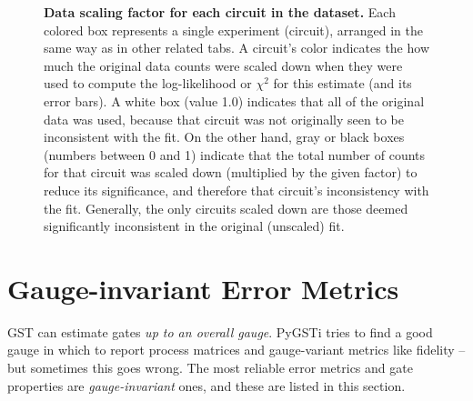 \documentclass{article}[11pt]
\newcommand{\putfield}[2]{#2}
\begin{document}
{{{}{}

\begin{figure}
  \begin{center}
    \putfield{dataScalingColorBoxPlot}{}
    \caption{\textbf{Data scaling factor for each circuit in the dataset.}  Each colored box represents a single experiment (circuit), arranged in the same way as in other related tabs.  A circuit's color indicates the how much the original data counts were scaled down when they were used to compute the log-likelihood or $\chi^2$ for this estimate (and its error bars).  A white box (value 1.0) indicates that all of the original data was used, because that circuit was not originally seen to be inconsistent with the fit. On the other hand, gray or black boxes (numbers between 0 and 1) indicate that the total number of counts for that circuit was scaled down (multiplied by the given factor) to reduce its significance, and therefore that circuit's inconsistency with the fit.  Generally, the only circuits scaled down are those deemed significantly inconsistent in the original (unscaled) fit.
    }
  \end{center}
\end{figure}

}{}


\section{Gauge-invariant Error Metrics}
GST can estimate gates \emph{up to an overall gauge}.  PyGSTi tries to find a good gauge in which to report process matrices and gauge-variant metrics like fidelity -- but sometimes this goes wrong.  The most reliable error metrics and gate properties are \emph{gauge-invariant} ones, and these are listed in this section.

}
\end{document}
